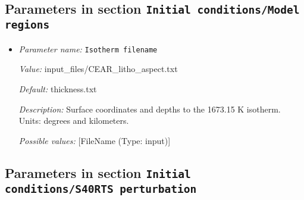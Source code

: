 \subsection{Parameters in section \tt Initial conditions/Model regions}
\label{parameters:Initial_20conditions/Model_20regions}

\begin{itemize}
\item {\it Parameter name:} {\tt Isotherm filename}
\label{parameters:Initial conditions/Model regions/Isotherm filename}


{\it Value:} input_files/CEAR_litho_aspect.txt


{\it Default:} thickness.txt


{\it Description:} Surface coordinates and depths to the 1673.15 K isotherm. Units: degrees and kilometers.


{\it Possible values:} [FileName (Type: input)]
\end{itemize}

\subsection{Parameters in section \tt Initial conditions/S40RTS perturbation}
\label{parameters:Initial_20conditions/S40RTS_20perturbation}

